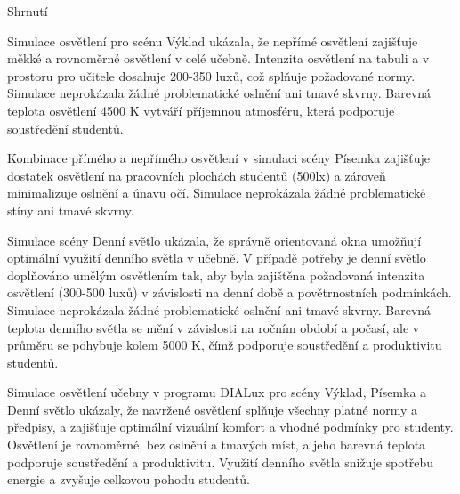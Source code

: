 \secc Shrnutí


Simulace osvětlení pro scénu Výklad ukázala, že nepřímé osvětlení zajišťuje měkké
a rovnoměrné osvětlení v celé učebně. Intenzita osvětlení na tabuli a v prostoru pro učitele dosahuje 200-350 luxů,
což splňuje požadované normy. Simulace neprokázala žádné problematické oslnění ani tmavé skvrny. Barevná teplota
osvětlení 4500 K vytváří příjemnou atmosféru, která podporuje soustředění studentů.


Kombinace přímého a nepřímého osvětlení v simulaci scény Písemka zajišťuje dostatek osvětlení na pracovních plochách studentů
(500lx) a zároveň minimalizuje oslnění a únavu očí.
Simulace neprokázala žádné problematické stíny ani tmavé skvrny.


Simulace scény Denní světlo ukázala, že správně orientovaná okna umožňují optimální využití denního
světla v učebně. V případě potřeby je denní světlo doplňováno umělým osvětlením tak, aby byla zajištěna požadovaná
intenzita osvětlení (300-500 luxů) v závislosti na denní době a povětrnostních podmínkách. Simulace neprokázala žádné
problematické oslnění ani tmavé skvrny. Barevná teplota denního světla se mění v závislosti na ročním období a počasí,
ale v průměru se pohybuje kolem 5000 K, čímž podporuje soustředění a produktivitu studentů.


Simulace osvětlení učebny v programu DIALux pro scény Výklad, Písemka a Denní světlo ukázaly, že navržené osvětlení
splňuje všechny platné normy a předpisy, a zajišťuje optimální vizuální komfort a vhodné podmínky pro studenty.
Osvětlení je rovnoměrné, bez oslnění a tmavých míst, a jeho barevná teplota podporuje soustředění a produktivitu.
Využití denního světla snižuje spotřebu energie a zvyšuje celkovou pohodu studentů.


